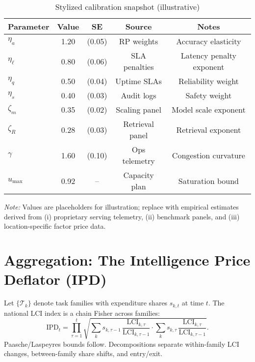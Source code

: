 \documentclass[12pt]{article}
\numberwithin{equation}{section}
\theoremstyle{definition}
\theoremstyle{plain}
\newcommand{\LCI}{\mathrm{LCI}}
\newcommand{\IPD}{\mathrm{IPD}}
\begin{document}
\begin{table}[t]
\centering
\begin{threeparttable}
\caption{Stylized calibration snapshot (illustrative)}
\label{tab:calib}
\begin{tabular}{l c c c c}
\toprule
Parameter & Value & SE & Source & Notes \\
\midrule
$\eta_a$ & 1.20 & (0.05) & RP weights & Accuracy elasticity \\
$\eta_\ell$ & 0.80 & (0.06) & SLA penalties & Latency penalty exponent \\
$\eta_q$ & 0.50 & (0.04) & Uptime SLAs & Reliability weight \\
$\eta_s$ & 0.40 & (0.03) & Audit logs & Safety weight \\
$\zeta_m$ & 0.35 & (0.02) & Scaling panel & Model scale exponent \\
$\zeta_R$ & 0.28 & (0.03) & Retrieval panel & Retrieval exponent \\
$\gamma$ & 1.60 & (0.10) & Ops telemetry & Congestion curvature \\
$u_{\max}$ & 0.92 & -- & Capacity plan & Saturation bound \\
\bottomrule
\end{tabular}
\begin{tablenotes}[flushleft]
\item \emph{Note:} Values are placeholders for illustration; replace with empirical estimates derived from (i) proprietary serving telemetry, (ii) benchmark panels, and (iii) location-specific factor price data.
\end{tablenotes}
\end{threeparttable}
\end{table}

\section{Aggregation: The Intelligence Price Deflator (IPD)}
Let $\{\mathcal T_k\}$ denote task families with expenditure shares $s_{k,t}$ at time $t$. The national LCI index is a chain Fisher across families:
\begin{equation}
\IPD_t
= \prod_{\tau=1}^{t}\sqrt{
\sum_k s_{k,\tau-1}\,\frac{\LCI_{k,\tau}}{\LCI_{k,\tau-1}}
\cdot
\sum_k s_{k,\tau}\,\frac{\LCI_{k,\tau}}{\LCI_{k,\tau-1}}
}.
\end{equation}
Paasche/Laspeyres bounds follow. Decompositions separate within-family LCI changes, between-family share shifts, and entry/exit.
\end{document}
